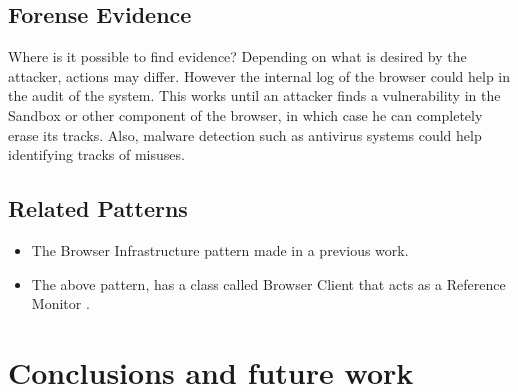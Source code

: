 \documentclass{sig-alternate-05-2015}
\begin{document}
\subsection*{Forense Evidence}
  Where is it possible to find evidence? Depending on what is desired by the attacker, actions may differ. However the internal log of the browser could help in the audit of the system. This works until an attacker finds a vulnerability in the Sandbox or other component of the browser, in which case he can completely erase its tracks. Also, malware detection such as antivirus systems could help identifying tracks of misuses.

\subsection*{Related Patterns}
  \begin{itemize}
    \item The Browser Infrastructure pattern made in a previous work.
    \item The above pattern, has a class called Browser Client that acts as a Reference Monitor \cite{fernandez2001pattern}.
  \end{itemize}


\section{Conclusions and future work}


\end{document}
